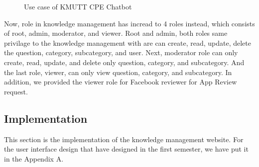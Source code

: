 \documentclass[12pt,oneside,openright,a4paper]{cpe-english-project}
\begin{document}
	\begin{figure}[!h]\centering
		\caption{Use case of KMUTT CPE Chatbot}\label{fig:Use case of KMUTT CPE Chatbot version2}
	\end{figure}


		Now, role in knowledge management has incread to 4 roles instead, which consists of
		root, admin, moderator, and viewer.
		Root and admin, both roles same privilage to the knowledge management
		with are can create, read, update, delete the question, category, subcategory, and user.
		Next, moderator role can only create, read, update, and delete only question, category, and subcategory.
		And the last role, viewer, can only view question, category, and subcategory.
		In addition, we provided the viewer role for Facebook reviewer for App Review request.

\pagebreak

	\subsection{Implementation}
	This section is the implementation of the knowledge management website.
	For the user interface design that have designed in the first semester,
	we have put it in the Appendix A.
\end{document}
